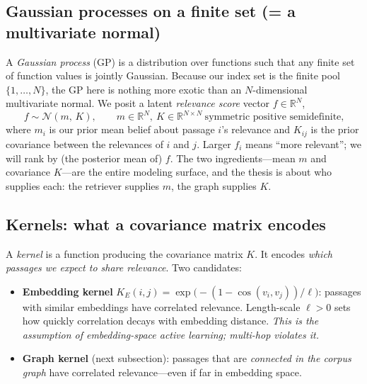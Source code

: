 \documentclass[11pt]{article}
\newcommand{\R}{\mathbb{R}}
\newcommand{\N}{\mathcal{N}}
\begin{document}
\subsection{Gaussian processes on a finite set (= a multivariate normal)}
A \emph{Gaussian process} (GP) is a distribution over functions such that any finite set of function values is
jointly Gaussian. Because our index set is the finite pool $\{1,\dots,N\}$, the GP here is nothing more exotic
than an $N$-dimensional multivariate normal. We posit a latent \emph{relevance score} vector $f\in\R^N$,
\begin{equation}
  f \sim \N(m,\,K),\qquad m\in\R^N,\ K\in\R^{N\times N}\ \text{symmetric positive semidefinite,}
\end{equation}
where $m_i$ is our prior mean belief about passage $i$'s relevance and $K_{ij}$ is the prior covariance between
the relevances of $i$ and $j$. Larger $f_i$ means ``more relevant''; we will rank by (the posterior mean of)
$f$. The two ingredients---mean $m$ and covariance $K$---are the entire modeling surface, and the thesis is
about who supplies each: the retriever supplies $m$, the graph supplies $K$.

\subsection{Kernels: what a covariance matrix encodes}
A \emph{kernel} is a function producing the covariance matrix $K$. It encodes \emph{which passages we expect to
share relevance}. Two candidates:
\begin{itemize}[leftmargin=*,itemsep=1pt]
  \item \textbf{Embedding kernel} $K_E(i,j)=\exp\!\big(-(1-\cos(v_i,v_j))/\ell\big)$: passages with similar
  embeddings have correlated relevance. Length-scale $\ell>0$ sets how quickly correlation decays with
  embedding distance. \emph{This is the assumption of embedding-space active learning; multi-hop violates it.}
  \item \textbf{Graph kernel} (next subsection): passages that are \emph{connected in the corpus graph} have
  correlated relevance---even if far in embedding space.
\end{itemize}
\end{document}
